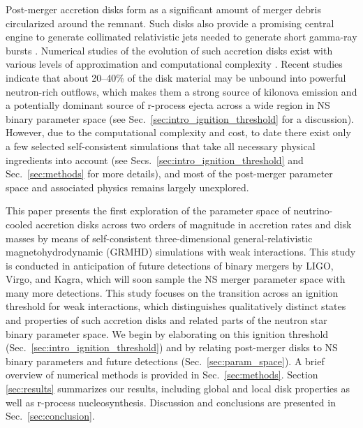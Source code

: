 Post-merger accretion disks form as a significant amount of merger debris circularized around the remnant. Such disks also provide a promising central engine to generate collimated relativistic jets needed to generate short gamma-ray bursts \cite{aloy_relativistic_2005,shibata_merger_2006,paschalidis_relativistic_2015,ruiz_binary_2016}. Numerical studies of the evolution of such accretion disks exist with various levels of approximation and computational complexity \cite{fernandez_delayed_2013,just_comprehensive_2015,siegel_three-dimensional_2017,fernandez_long-term_2019,christie_role_2019,miller_full_2019-1,fujibayashi_properties_2017,fujibayashi_mass_2020}. Recent studies indicate that about 20--40\% of the disk material may be unbound into powerful neutron-rich outflows, which makes them a strong source of kilonova emission and a potentially dominant source of r-process ejecta across a wide region in NS binary parameter space (see Sec.~\ref{sec:intro_ignition_threshold} for a discussion). However, due to the computational complexity and cost, to date there exist only a few selected self-consistent simulations \cite{siegel_three-dimensional_2017,siegel_three-dimensional_2018,fernandez_long-term_2019,christie_role_2019,miller_full_2019-1} that take all necessary physical ingredients into account (see Secs.~\ref{sec:intro_ignition_threshold} and Sec.~\ref{sec:methods} for more details), and most of the post-merger parameter space and associated physics remains largely unexplored.

This paper presents the first exploration of the parameter space of neutrino-cooled accretion disks across two orders of magnitude in accretion rates and disk masses by means of self-consistent three-dimensional general-relativistic magnetohydrodynamic (GRMHD) simulations with weak interactions. This study is conducted in anticipation of future detections of binary mergers by LIGO, Virgo, and Kagra, which will soon sample the NS merger parameter space with many more detections. This study focuses on the transition across an ignition threshold for weak interactions, which distinguishes qualitatively distinct states and properties of such accretion disks and related parts of the neutron star binary parameter space. We begin by elaborating on this ignition threshold (Sec.~\ref{sec:intro_ignition_threshold}) and by relating post-merger disks to NS binary parameters and future detections (Sec.~\ref{sec:param_space}). A brief overview of numerical methods is provided in Sec.~\ref{sec:methods}. Section \ref{sec:results} summarizes our results, including global and local disk properties as well as r-process nucleosynthesis. Discussion and conclusions are presented in Sec.~\ref{sec:conclusion}.


